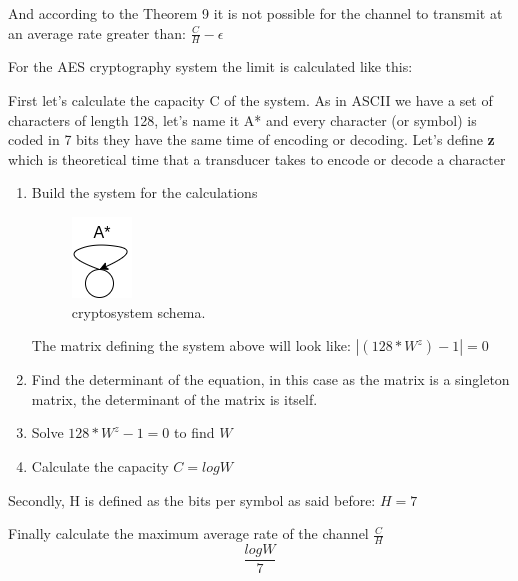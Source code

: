 And according to the Theorem 9 it is not possible for the channel to transmit at an average rate greater than: $\frac{C}{H}-\epsilon$

For the AES cryptography system the limit is calculated like this:

First let's calculate the capacity C of the system.
As in ASCII we have a set of characters of length 128, let's name it A* and every character (or symbol) is coded in 7 bits they have the same time of encoding or decoding.
Let's define \textbf{z} which is theoretical time that a transducer takes to encode or decode a character
\begin{enumerate}
    \item Build the system for the calculations
        \begin{figure}[H]
          \centering
          \includegraphics[width=0.15\linewidth]{images/system.png}
          \caption{cryptosystem schema.}
          \label{fig:cryptosystem}
        \end{figure}
        The matrix defining the system above will look like:
        $\left|({128*W^{z}})-1\right| = 0$
    \item Find the determinant of the equation, in this case as the matrix is a singleton matrix, the determinant of the matrix is itself.
    \item Solve ${128*W^{z}}-1 = 0$ to find $W$
    \item Calculate the capacity $C = logW$
\end{enumerate}

Secondly, H is defined as the bits per symbol as said before:
$H = 7$

Finally calculate the maximum average rate of the channel $\frac{C}{H}$
\begin{equation}
    \frac{logW}{7}
\end{equation}
